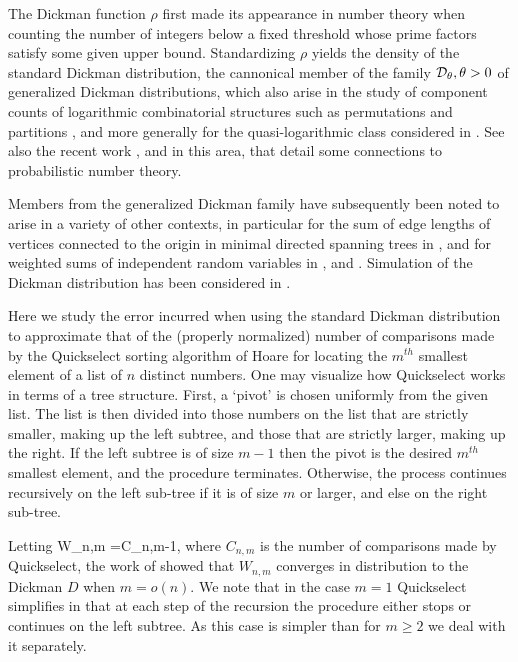 \documentclass[12pt]{article}
\begin{document}
The Dickman function $\rho$ first made its appearance in number theory \cite{dickman1930frequency} when counting the number of integers below a fixed threshold whose prime factors satisfy some given upper bound. Standardizing $\rho$ yields the density of the standard Dickman distribution, the cannonical member of the family ${\cal D}_\theta, \theta>0$ of generalized Dickman distributions, which also arise in the study of component counts of 
logarithmic combinatorial structures such as permutations and partitions \cite{MR2032426}, and more generally for the quasi-logarithmic class considered in \cite{MR2793242}.
See also the recent work \cite{pinsky2016natural}, \cite{azmoodeh2016distances} and \cite{bhattacharjee2017dickman} in this area, that detail some connections to probabilistic number theory. 

Members from the generalized Dickman family have subsequently been noted to arise in a variety of other contexts, in particular for the sum of edge lengths of vertices connected to the origin in minimal directed spanning trees in \cite{MR2079909}, and for weighted sums of independent random variables in \cite{MR3751078}, \cite{azmoodeh2016distances} and \cite{bhattacharjee2017dickman}. Simulation of the Dickman distribution has been considered in \cite{MR2575452}. 


Here we study the error incurred when using the standard Dickman distribution to approximate that of the (properly normalized) number of comparisons made by the Quickselect sorting algorithm of Hoare \cite{hoare1961algorithm} for locating the $m^{th}$ smallest element of a list of $n$ distinct numbers. 
One may visualize how Quickselect works in terms of a tree structure. First, a `pivot'  is chosen uniformly from the given list. The list is then divided into those numbers on the list that are strictly smaller, making up the left subtree, and those that are strictly larger, making up the right. If the left subtree is of size $m-1$ then the pivot is the desired $m^{th}$ smallest element, and the procedure terminates. Otherwise, the process continues recursively on the left sub-tree if it is of size $m$ or larger, and else on the right sub-tree. 


Letting
\bea \label{eq:intro.def.wnm}
W_{n,m} =C_{n,m}-1,
\ena
where $C_{n,m}$ is the number of comparisons made by Quickselect, the work of \cite{MR1918722} showed that $W_{n,m}$ converges in distribution to the Dickman $D$ when $m=o(n)$. We note that in the case $m=1$ Quickselect simplifies in that at each step of the recursion the procedure either stops or continues on the left subtree. As this case is simpler than for $m \ge 2$ we deal with it separately.
\end{document}
